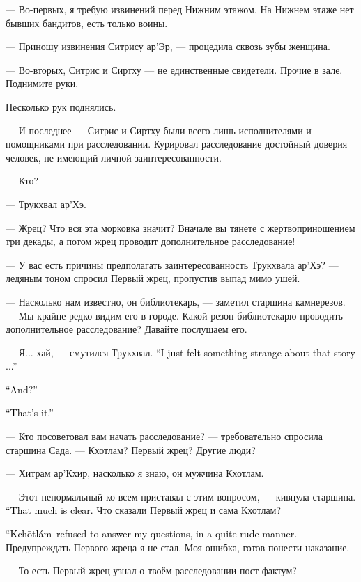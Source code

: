 \documentclass[a4paper,10pt,fleqn]{book}\usepackage{cooltooltips}\usepackage{polyglossia}\setdefaultlanguage{english}\setotherlanguage{russian}\defaultfontfeatures{Ligatures=TeX,Mapping=tex-text} \usepackage{xcolor}\definecolor{lightgray}{HTML}{bbbbbb}\color{lightgray}\newcommand{\ml}[3]{\textcolor{black}{#3}}
\newcommand{\Kchotlam}{Kch\={o}tl\'{a}m}
\begin{document}
--- Во-первых, я требую извинений перед Нижним этажом.
На Нижнем этаже нет бывших бандитов, есть только воины.

--- Приношу извинения Ситрису ар'Эр, --- процедила сквозь зубы женщина.

--- Во-вторых, Ситрис и Сиртху --- не единственные свидетели.
Прочие в зале.
Поднимите руки.

Несколько рук поднялись.

--- И последнее --- Ситрис и Сиртху были всего лишь исполнителями и помощниками при расследовании.
Курировал расследование достойный доверия человек, не имеющий личной заинтересованности.

--- Кто?

--- Трукхвал ар'Хэ.

--- Жрец?
Что вся эта морковка значит?
Вначале вы тянете с жертвоприношением три декады, а потом жрец проводит дополнительное расследование!

--- У вас есть причины предполагать заинтересованность Трукхвала ар'Хэ? --- ледяным тоном спросил Первый жрец, пропустив выпад мимо ушей.

--- Насколько нам известно, он библиотекарь, --- заметил старшина камнерезов.
--- Мы крайне редко видим его в городе.
Какой резон библиотекарю проводить дополнительное расследование?
Давайте послушаем его.

--- Я... хай, --- смутился Трукхвал.
\ml{$0$}
{--- Мне просто показалось, что не вяжется что-то в этой истории...}
{``I just felt something strange about that story ...''}

\ml{$0$}
{--- И всё?}
{``And?''}

\ml{$0$}
{--- Всё.}
{``That's it.''}

--- Кто посоветовал вам начать расследование? --- требовательно спросила старшина Сада.
--- Кхотлам?
Первый жрец?
Другие люди?

--- Хитрам ар'Кхир, насколько я знаю, он мужчина Кхотлам.

--- Этот ненормальный ко всем приставал с этим вопросом, --- кивнула старшина.
\ml{$0$}
{--- В общем, понятно.}
{``That much is clear.}
Что сказали Первый жрец и сама Кхотлам?

\ml{$0$}
{--- Кхотлам отказалась отвечать на мои вопросы, в довольно грубой форме.}
{``\Kchotlam\ refused to answer my questions, in a quite rude manner.}
Предупреждать Первого жреца я не стал.
Моя ошибка, готов понести наказание.

--- То есть Первый жрец узнал о твоём расследовании пост-фактум?
\end{document}
